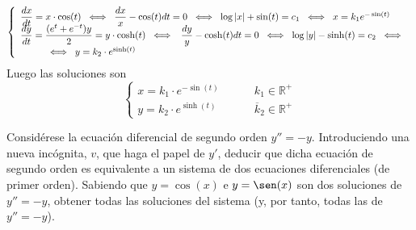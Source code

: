 \begin{sol}
    $$\left\{ \begin{array}{l}
          \dfrac{dx}{dt}=x \cdot \cos(t) \; \iff \; \dfrac{dx}{x}-\cos(t)dt=0 \; \iff \; \log|x|+\sin(t)=c_1 \; \iff \; x=k_1 e^{-\sin(t)} \\
        \vspace{-5mm} \\
          \dfrac{dy}{dt}=\dfrac{(e^t+e^{-t})y}{2}=y \cdot \cosh(t) \; \iff \;  \: \dfrac{dy}{y}-\cosh(t)dt=0 \; \iff \; \log|y|-\sinh(t)=c_2\; \iff \;  \\
          \hspace{1cm} \iff \; y=k_2\cdot e^{\sinh(t)} 
    \end{array} \right.$$
    Luego las soluciones son
    $$\left\{ \begin{array}{ll}
         x=k_1 \cdot e^{-\sin(t)} & \; \qquad k_1 \in \mathbb R^+\\
         y=k_2 \cdot e^{\sinh(t)}  & \; \qquad \overline{k}_2 \in \mathbb R^+
    \end{array}\right.$$
\end{sol}
\begin{ejer}
     Considérese la ecuación diferencial de segundo orden $y''=-y$. Introduciendo una nueva incógnita, $v$, que haga el papel de $y'$, deducir que dicha ecuación de segundo orden es equivalente a un sistema de dos ecuaciones diferenciales (de primer orden). Sabiendo que $y=\cos(x)$ e $y=\sen(x)$ son dos soluciones de $y''=-y$, obtener todas las soluciones del sistema (y, por tanto, todas las de $y''=-y$).
\end{ejer}
